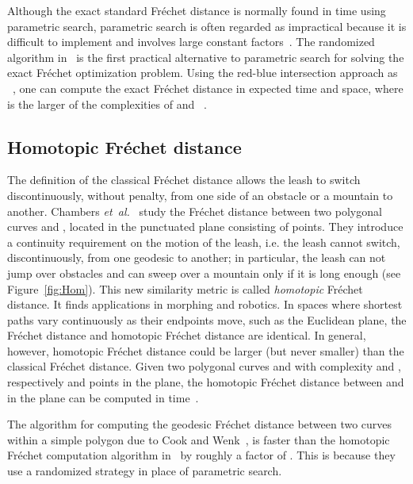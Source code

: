 \documentclass[12pt]{dalthesis}
\newcommand{\etal}{{\em et~al.\/}}
\newcommand{\Frechet}{Fr\'echet }
\begin{document}
Although the exact standard \Frechet distance is normally found in
 time using parametric search, parametric search
is often regarded as impractical because it is difficult to implement and
involves large constant factors~\cite{Cole87}. 
The randomized algorithm in~\cite{WenkC08a} 
is the first practical alternative to parametric search
for solving the exact \Frechet optimization problem.
Using the red-blue intersection approach as ~\cite{WenkC08a}, 
one can compute the exact \Frechet distance in  expected
time and  space, where  is the larger of the complexities of 
and ~\cite{WenkC08a}.










\subsection{Homotopic \Frechet distance}


The definition of the classical \Frechet distance allows the leash to switch discontinuously, 
without penalty, from one side of an obstacle or a mountain to another.
Chambers  \etal~\cite{Chambers10} study the \Frechet distance between two 
polygonal curves  and , located in the punctuated plane  consisting of  
 points. They introduce a continuity requirement on the motion of the leash, i.e. the leash cannot switch, discontinuously, from one geodesic to another; in particular, the leash can not jump over obstacles  and can sweep over a mountain only if it is long enough
(see Figure~\ref{fig:Hom}).
This new similarity metric is called {\em homotopic} \Frechet distance.
It finds applications in morphing and robotics.
In spaces where shortest paths vary continuously
as their endpoints move, such as the Euclidean plane, the
\Frechet distance and homotopic \Frechet distance are
identical. In general, however, homotopic \Frechet distance
could be larger (but never smaller) than the classical
\Frechet distance.
Given two polygonal curves  and  with complexity  and , respectively 
and  points in the plane,
the homotopic \Frechet distance between  and  in the plane can be computed
in  time~\cite{Chambers10}.



The algorithm for computing the geodesic \Frechet distance between two curves within a simple
polygon due to Cook and Wenk~\cite{WenkC08a}, is faster than the homotopic \Frechet computation algorithm in~\cite{Chambers10} by roughly a factor of . This is because they use a randomized strategy in place of parametric search. 
\end{document}

